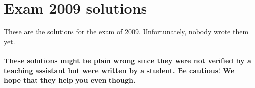\documentclass[main]{subfiles}
\begin{document}

\section{Exam 2009 solutions}
These are the solutions for the exam of 2009. Unfortunately, nobody wrote them yet.
\\\\
\textbf{These solutions might be plain wrong since they were not verified by a teaching assistant but were written by a student. Be cautious! We hope that they help you even though.}

\end{document}
